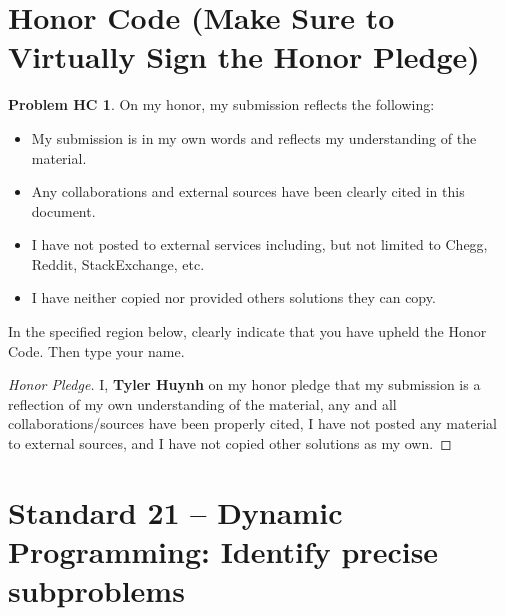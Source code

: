 \documentclass[11pt]{article}
\theoremstyle{definition}
\theoremstyle{definition}
\newtheorem*{requiredHC}{Problem HC}
\theoremstyle{definition}
\begin{document}
\section*{Honor Code (Make Sure to Virtually Sign the Honor Pledge)} 
\hypertarget{HonorCode}{}

\begin{requiredHC}
On my honor, my submission reflects the following:
\begin{itemize}
\item My submission is in my own words and reflects my understanding of the material.
\item Any collaborations and external sources have been clearly cited in this document.
\item I have not posted to external services including, but not limited to Chegg, Reddit, StackExchange, etc.
\item I have neither copied nor provided others solutions they can copy.
\end{itemize}

\noindent In the specified region below, clearly indicate that you have upheld the Honor Code. Then type your name. 
\end{requiredHC}

\begin{proof}[Honor Pledge]
I, \textbf{Tyler Huynh} on my honor pledge that my submission is a reflection of my own understanding of the material, any and all collaborations/sources have been properly cited, I have not posted any material to external sources, and I have not copied other solutions as my own.\end{proof}


\newpage
\setcounter{section}{20}
\section{Standard 21 -- Dynamic Programming: Identify precise subproblems}
\end{document}
